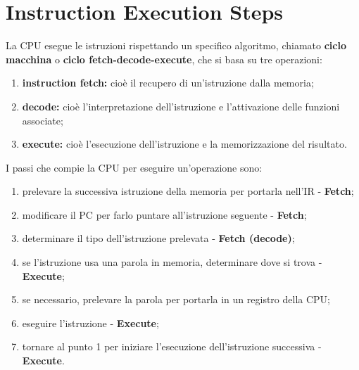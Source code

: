 \documentclass[12pt]{report}
\begin{document}
\section{Instruction Execution Steps}
La CPU esegue le istruzioni rispettando un specifico algoritmo, chiamato \textbf{ciclo macchina} o \textbf{ciclo fetch-decode-execute}, che si basa su tre operazioni:
\begin{enumerate}
	\item \textbf{instruction fetch:} cioè il recupero di un'istruzione dalla memoria;
	\item \textbf{decode:} cioè l'interpretazione dell'istruzione e l'attivazione delle funzioni associate;
	\item \textbf{execute:} cioè l'esecuzione dell'istruzione e la memorizzazione del risultato.
\end{enumerate}
I passi che compie la CPU per eseguire un'operazione sono:
\begin{enumerate}
	\item prelevare la successiva istruzione della memoria per portarla nell'IR - \textbf{Fetch};
	\item modificare il PC per farlo puntare all'istruzione seguente - \textbf{Fetch};
	\item  determinare il tipo dell'istruzione prelevata - \textbf{Fetch (decode)};
	\item se l'istruzione usa una parola in memoria, determinare dove si trova - \textbf{Execute};
	\item se necessario, prelevare la parola per portarla in un registro della CPU;
	\item eseguire l'istruzione - \textbf{Execute};
	\item tornare al punto 1 per iniziare l'esecuzione dell'istruzione successiva - \textbf{Execute}.
\end{enumerate}
\end{document}
